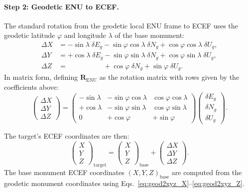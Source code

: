 \paragraph{Step 2: Geodetic ENU to ECEF.} The standard rotation from the geodetic local ENU frame to ECEF uses the geodetic latitude $\varphi$ and longitude $\lambda$ of the base monument:
\begin{align}
\Delta X &= -\sin\lambda\;\delta E_g - \sin\varphi\cos\lambda\;\delta N_g + \cos\varphi\cos\lambda\;\delta U_g, \label{eq:enu2ecef_X}\\
\Delta Y &= +\cos\lambda\;\delta E_g - \sin\varphi\sin\lambda\;\delta N_g + \cos\varphi\sin\lambda\;\delta U_g, \label{eq:enu2ecef_Y}\\
\Delta Z &= \phantom{+\cos\lambda\;\delta E_g} + \cos\varphi\;\delta N_g + \sin\varphi\;\delta U_g. \label{eq:enu2ecef_Z}
\end{align}
In matrix form, defining $\mathbf{R}_{\text{ENU}}$ as the rotation matrix with rows given by the coefficients above:
\begin{equation}
\begin{pmatrix} \Delta X \\ \Delta Y \\ \Delta Z \end{pmatrix}
=
\begin{pmatrix}
-\sin\lambda & -\sin\varphi\cos\lambda & \cos\varphi\cos\lambda \\
+\cos\lambda & -\sin\varphi\sin\lambda & \cos\varphi\sin\lambda \\
0 & +\cos\varphi & +\sin\varphi
\end{pmatrix}
\begin{pmatrix} \delta E_g \\ \delta N_g \\ \delta U_g \end{pmatrix}.
\label{eq:enu2ecef_matrix}
\end{equation}

The target's ECEF coordinates are then:
\begin{equation}
\begin{pmatrix} X \\ Y \\ Z \end{pmatrix}_{\!\text{target}}
=
\begin{pmatrix} X \\ Y \\ Z \end{pmatrix}_{\!\text{base}}
+
\begin{pmatrix} \Delta X \\ \Delta Y \\ \Delta Z \end{pmatrix}.
\label{eq:target_ecef}
\end{equation}
The base monument ECEF coordinates $(X, Y, Z)_{\text{base}}$ are computed from the geodetic monument coordinates using Eqs.~\eqref{eq:geod2xyz_X}--\eqref{eq:geod2xyz_Z}.

